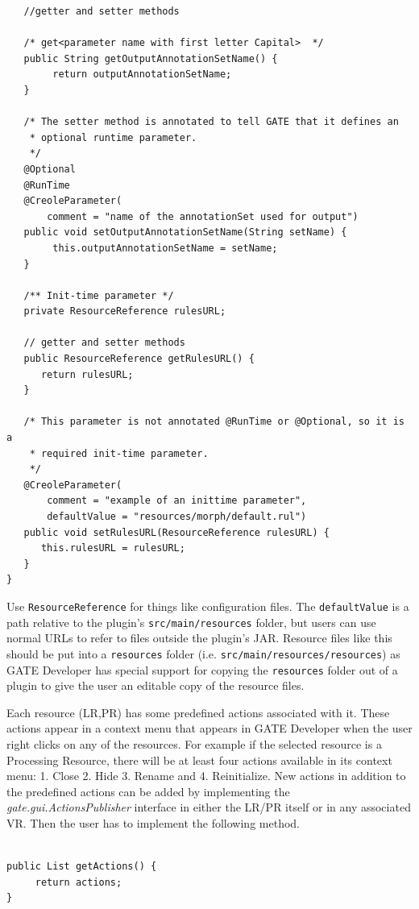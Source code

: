 \begin{lstlisting}
   //getter and setter methods

   /* get<parameter name with first letter Capital>  */
   public String getOutputAnnotationSetName() {
        return outputAnnotationSetName;
   }

   /* The setter method is annotated to tell GATE that it defines an
    * optional runtime parameter.
    */
   @Optional
   @RunTime
   @CreoleParameter(
       comment = "name of the annotationSet used for output")
   public void setOutputAnnotationSetName(String setName) {
        this.outputAnnotationSetName = setName;
   }

   /** Init-time parameter */
   private ResourceReference rulesURL;

   // getter and setter methods
   public ResourceReference getRulesURL() {
      return rulesURL;
   }

   /* This parameter is not annotated @RunTime or @Optional, so it is a
    * required init-time parameter.
    */
   @CreoleParameter(
       comment = "example of an inittime parameter",
       defaultValue = "resources/morph/default.rul")
   public void setRulesURL(ResourceReference rulesURL) {
      this.rulesURL = rulesURL;
   }
}
\end{lstlisting}

Use \verb!ResourceReference! for things like configuration files.  The
\verb!defaultValue! is a path relative to the plugin's
\verb!src/main/resources! folder, but users can use normal URLs to refer to
files outside the plugin's JAR.  Resource files like this should be put into a
\verb!resources! folder (i.e. \verb!src/main/resources/resources!) as GATE
Developer has special support for copying the \verb!resources! folder out of a
plugin to give the user an editable copy of the resource files.


Each resource (LR,PR) has some predefined actions associated with
it. These actions appear in a context menu that appears in GATE
Developer when the user right clicks on any of the resources. For
example if the selected resource is a Processing Resource, there will
be at least four actions available in its context menu: 1. Close
2. Hide 3. Rename and 4. Reinitialize. New actions in
addition to the predefined actions can be added by implementing the
\textit{gate.gui.ActionsPublisher} interface in either the LR/PR itself or in
any associated VR. Then the user has to implement the
following method.

\begin{small}\begin{verbatim}

public List getActions() {
     return actions;
}

\end{verbatim}\end{small}


